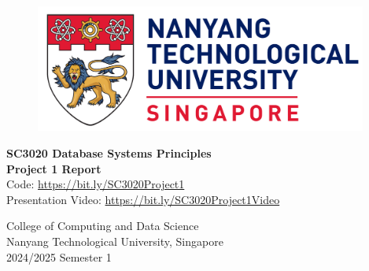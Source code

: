 \begin{titlepage}
	\begin{figure}[!t]
		\centering
		\includegraphics[width = 4.3in]{title/logo.pdf}
	\end{figure}

	\centering
	\huge{\textbf{SC3020 Database Systems Principles}}\\[0.2in]
	\huge{\textbf{Project 1 Report}}\\[2in]
        \small {Code: \url{https://bit.ly/SC3020Project1}} \\
        \small {Presentation Video: \url{https://bit.ly/SC3020Project1Video}}


	\begin{table}[h]
		\centering
	\end{table}






	\vspace{0.5in}
    \LARGE{College of Computing and Data Science}\\
	\LARGE{Nanyang Technological University, Singapore}\\[0.3in]


	\LARGE{2024/2025 Semester 1}
	\newpage
\end{titlepage}
